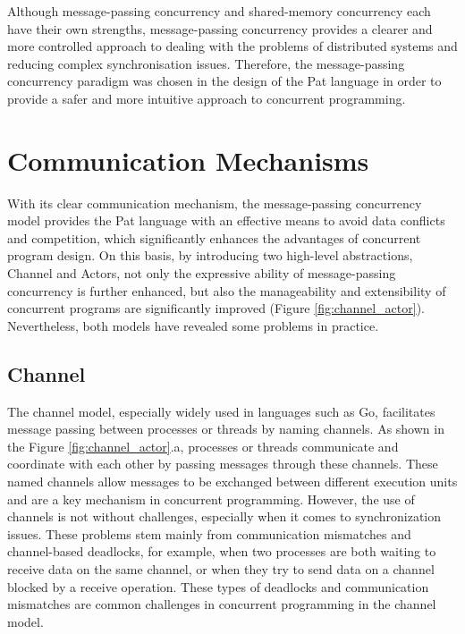 \documentclass{l4proj}
\begin{document}
Although message-passing concurrency and shared-memory concurrency each have their own strengths, message-passing concurrency provides a clearer and more controlled approach to dealing with the problems of distributed systems and reducing complex synchronisation issues. Therefore, the message-passing concurrency paradigm was chosen in the design of the Pat language in order to provide a safer and more intuitive approach to concurrent programming.

\section{Communication Mechanisms}
With its clear communication mechanism, the message-passing concurrency model provides the Pat language with an effective means to avoid data conflicts and competition, which significantly enhances the advantages of concurrent program design. On this basis, by introducing two high-level abstractions, Channel and Actors, not only the expressive ability of message-passing concurrency is further enhanced, but also the manageability and extensibility of concurrent programs are significantly improved (Figure \ref{fig:channel_actor}). Nevertheless, both models have revealed some problems in practice.

\subsection{Channel}
The channel model, especially widely used in languages such as Go, facilitates message passing between processes or threads by naming channels. As shown in the Figure \ref{fig:channel_actor}.a, processes or threads communicate and coordinate with each other by passing messages through these channels. These named channels allow messages to be exchanged between different execution units and are a key mechanism in concurrent programming. However, the use of channels is not without challenges, especially when it comes to synchronization issues. These problems stem mainly from communication mismatches and channel-based deadlocks, for example, when two processes are both waiting to receive data on the same channel, or when they try to send data on a channel blocked by a receive operation. These types of deadlocks and communication mismatches are common challenges in concurrent programming in the channel model.
\end{document}
